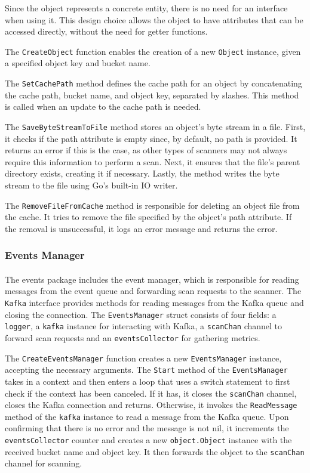 \documentclass[12pt, conference, final, a4paper, onecolumn, compsoc]{IEEEtran}
\begin{document}
Since the object represents a concrete entity, there is no need for an interface
when using it. This design choice allows the object to have attributes that can
be accessed directly, without the need for getter functions.

The \texttt{CreateObject} function enables the creation of a new \texttt{Object}
instance, given a specified object key and bucket name.

The \texttt{SetCachePath} method defines the cache path for an object by
concatenating the cache path, bucket name, and object key, separated by slashes.
This method is called when an update to the cache path is needed.

The \texttt{SaveByteStreamToFile} method stores an object's byte stream in a
file. First, it checks if the path attribute is empty since, by default, no path
is provided. It returns an error if this is the case, as other types of scanners
may not always require this information to perform a scan. Next, it ensures that
the file's parent directory exists, creating it if necessary. Lastly, the method
writes the byte stream to the file using Go's built-in IO writer.

The \texttt{RemoveFileFromCache} method is responsible for deleting an object
file from the cache. It tries to remove the file specified by the object's path
attribute. If the removal is unsuccessful, it logs an error message and returns
the error.

\subsubsection*{Events Manager}
\paragraph{}
The events package includes the event manager, which is responsible for reading
messages from the event queue and forwarding scan requests to the scanner. The
\texttt{Kafka} interface provides methods for reading messages from the Kafka
queue and closing the connection. The \texttt{EventsManager} struct consists of
four fields: a \texttt{logger}, a \texttt{kafka} instance for interacting with
Kafka, a \texttt{scanChan} channel to forward scan requests and an
\texttt{eventsCollector} for gathering metrics.

The \texttt{CreateEventsManager} function creates a new \texttt{EventsManager}
instance, accepting the necessary arguments. The \texttt{Start} method of the
\texttt{EventsManager} takes in a context and then enters a loop that uses a
switch statement to first check if the context has been canceled. If it has, it
closes the \texttt{scanChan} channel, closes the Kafka connection and returns.
Otherwise, it invokes the \texttt{ReadMessage} method of the \texttt{kafka}
instance to read a message from the Kafka queue. Upon confirming that there is
no error and the message is not nil, it increments the \texttt{eventsCollector}
counter and creates a new \texttt{object.Object} instance with the received
bucket name and object key. It then forwards the object to the \texttt{scanChan}
channel for scanning.
\end{document}
